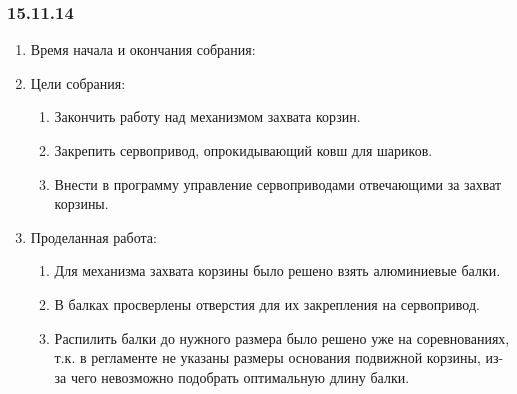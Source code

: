 
\subsubsection{15.11.14}

\begin{enumerate} 
	\item Время начала и окончания собрания:
	
	\item Цели собрания:
	\begin{enumerate}
		\item Закончить работу над механизмом захвата корзин.
		
		\item Закрепить сервопривод, опрокидывающий ковш для шариков.
		
		\item Внести в программу управление сервоприводами отвечающими за захват корзины.
		
	\end{enumerate}
	
	\item Проделанная работа:
	\begin{enumerate}
		\item Для механизма захвата корзины было решено взять алюминиевые балки. 
		
		\item В балках просверлены отверстия для их закрепления на сервопривод.
		
		\item Распилить балки до нужного размера было решено уже на соревнованиях, т.к. в регламенте не указаны размеры основания подвижной корзины, из-за чего невозможно подобрать оптимальную длину балки.
		

\end{enumerate}
\end{enumerate}
